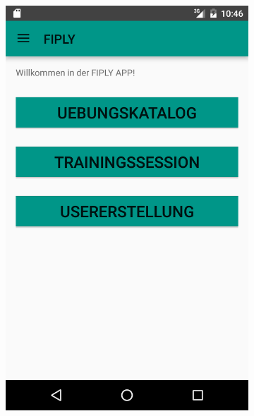 \documentclass[FIPLY_base.tex]{subfiles}
\begin{document}
\begin{figure}[H]
\begin{subfigure}[h]{0.3\textwidth}
	\end{subfigure}
	\hfil
	\begin{subfigure}[h]{0.3\textwidth}
	\includegraphics[scale=0.20]{img/MFragment}
	\end{subfigure}	
	\caption{Bild des NavigationDrawers und des FMains} 
	\ \\
	\begin{subfigure}[h]{0.3\textwidth}

\end{subfigure}
\end{figure}
\end{document}
